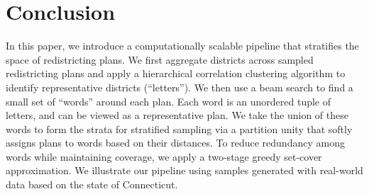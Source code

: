 \section{Conclusion}\label{sec:chap4 conclusion}

In this paper, we introduce a computationally scalable pipeline that stratifies the space of redistricting plans.
We first aggregate districts across sampled redistricting plans and apply a hierarchical correlation clustering algorithm \hccultra to identify representative districts (``letters'').
We then use a beam search to find a small set of ``words'' around each plan.
Each word is an unordered tuple of letters, and can be viewed as a representative plan.
We take the union of these words to form the strata for stratified sampling via a partition unity that softly assigns plans to words based on their distances.
To reduce redundancy among words while maintaining coverage, we apply a two-stage greedy set-cover approximation.
We illustrate our pipeline using samples generated with real-world data based on the state of Connecticut.
